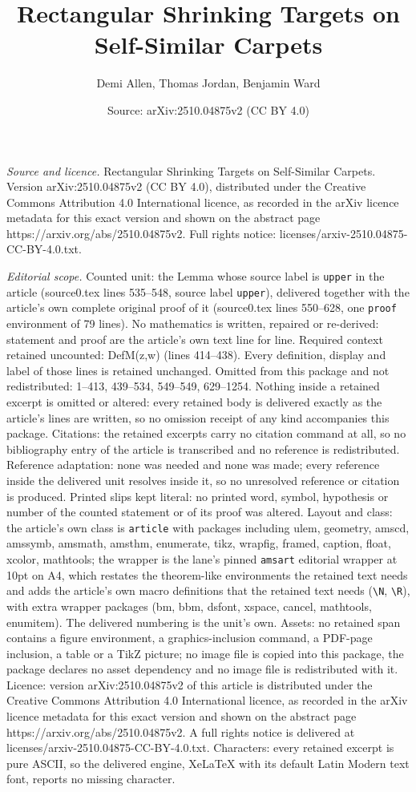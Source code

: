 \documentclass[10pt,a4paper]{amsart}
\title[Rectangular Shrinking Targets on Self-Similar Carpets]{Rectangular Shrinking Targets on Self-Similar Carpets}
\author{Demi Allen, Thomas Jordan, Benjamin Ward}
\date{Source: arXiv:2510.04875v2 (CC BY 4.0)}
\begin{document}
\maketitle

\noindent\emph{Source and licence.} Rectangular Shrinking Targets on Self-Similar Carpets. Version arXiv:2510.04875v2 (CC BY 4.0), distributed under the Creative Commons Attribution 4.0 International licence, as recorded in the arXiv licence metadata for this exact version and shown on the abstract page https://arxiv.org/abs/2510.04875v2. Full rights notice: licenses/arxiv-2510.04875-CC-BY-4.0.txt.\par\smallskip

\noindent\textit{Editorial scope.} Counted unit: the Lemma whose source label is \texttt{upper} in the article (source0.tex lines 535--548, source label \texttt{upper}), delivered together with the article's own complete original proof of it (source0.tex lines 550--628, one \texttt{proof} environment of 79 lines). No mathematics is written, repaired or re-derived: statement and proof are the article's own text line for line. Required context retained uncounted: DefM(z,w) (lines 414--438). Every definition, display and label of those lines is retained unchanged. Omitted from this package and not redistributed: 1--413, 439--534, 549--549, 629--1254. Nothing inside a retained excerpt is omitted or altered: every retained body is delivered exactly as the article's lines are written, so no omission receipt of any kind accompanies this package. Citations: the retained excerpts carry no citation command at all, so no bibliography entry of the article is transcribed and no reference is redistributed. Reference adaptation: none was needed and none was made; every reference inside the delivered unit resolves inside it, so no unresolved reference or citation is produced. Printed slips kept literal: no printed word, symbol, hypothesis or number of the counted statement or of its proof was altered. Layout and class: the article's own class is \texttt{article} with packages including ulem, geometry, amscd, amssymb, amsmath, amsthm, enumerate, tikz, wrapfig, framed, caption, float, xcolor, mathtools; the wrapper is the lane's pinned \texttt{amsart} editorial wrapper at 10pt on A4, which restates the theorem-like environments the retained text needs and adds the article's own macro definitions that the retained text needs (\texttt{\textbackslash N}, \texttt{\textbackslash R}), with extra wrapper packages (bm, bbm, dsfont, xspace, cancel, mathtools, enumitem). The delivered numbering is the unit's own. Assets: no retained span contains a figure environment, a graphics-inclusion command, a PDF-page inclusion, a table or a TikZ picture; no image file is copied into this package, the package declares no asset dependency and no image file is redistributed with it. Licence: version arXiv:2510.04875v2 of this article is distributed under the Creative Commons Attribution 4.0 International licence, as recorded in the arXiv licence metadata for this exact version and shown on the abstract page https://arxiv.org/abs/2510.04875v2. A full rights notice is delivered at licenses/arxiv-2510.04875-CC-BY-4.0.txt. Characters: every retained excerpt is pure ASCII, so the delivered engine, XeLaTeX with its default Latin Modern text font, reports no missing character.
\end{document}
